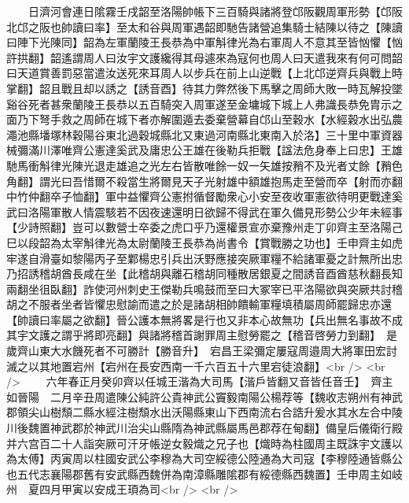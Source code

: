 　　日濟河會連日隂霧壬戌韶至洛陽帥帳下三百騎與諸將登邙阪觀周軍形勢【邙阪北邙之阪也帥讀曰率】至太和谷與周軍遇韶即馳告諸營追集騎士結陳以待之【陳讀曰陣下光陳同】韶為左軍蘭陵王長恭為中軍斛律光為右軍周人不意其至皆忷懼【忷許拱翻】韶遙謂周人曰汝宇文護纔得其母遽來為寇何也周人曰天遣我來有何可問韶曰天道賞善罰惡當遣汝送死來耳周人以步兵在前上山逆戰【上北邙逆齊兵與戰上時掌翻】韶且戰且却以誘之【誘音酉】待其力弊然後下馬擊之周師大敗一時瓦解投墜谿谷死者甚衆蘭陵王長恭以五百騎突入周軍遂至金墉城下城上人弗識長恭免胄示之面乃下弩手救之周師在城下者亦解圍遁去委棄營幕自邙山至穀水【水經穀水出弘農澠池縣墦塚林穀陽谷東北過穀城縣北又東過河南縣北東南入於洛】三十里中軍資器械彌滿川澤唯齊公憲達奚武及庸忠公王雄在後勒兵拒戰【諡法危身奉上曰忠】王雄馳馬衝斛律光陳光退走雄追之光左右皆散唯餘一奴一矢雄按矟不及光者丈餘【矟色角翻】謂光曰吾惜爾不殺當生將爾見天子光射雄中額雄抱馬走至營而卒【射而亦翻中竹仲翻卒子恤翻】軍中益懼齊公憲拊循督勵衆心小安至夜收軍憲欲待明更戰達奚武曰洛陽軍散人情震駭若不因夜速還明日欲歸不得武在軍久備見形勢公少年未經事【少詩照翻】豈可以數營士卒委之虎口乎乃還權景宣亦棄豫州走丁卯齊主至洛陽己巳以段韶為太宰斛律光為太尉蘭陵王長恭為尚書令【賞戰勝之功也】壬申齊主如虎牢遂自滑臺如黎陽丙子至鄴楊忠引兵出沃野應接突厥軍糧不給諸軍憂之計無所出忠乃招誘稽胡酋長咸在坐【此稽胡與離石稽胡同種散居銀夏之間誘音酉酋慈秋翻長知兩翻坐徂臥翻】詐使河州刺史王傑勒兵鳴鼓而至曰大冢宰已平洛陽欲與突厥共討稽胡之不服者坐者皆懼忠慰諭而遣之於是諸胡相帥饋輸軍糧填積屬周師罷歸忠亦還【帥讀曰率屬之欲翻】晉公護本無將畧是行也又非本心故無功【兵出無名事故不成其宇文護之謂乎將即亮翻】與諸將稽首謝罪周主慰勞罷之【稽音啓勞力到翻】　是歲齊山東大水饑死者不可勝計【勝音升】　宕昌王梁彌定屢寇周邉周大將軍田宏討滅之以其地置宕州【宕州在長安西南一千六百五十六里宕徒浪翻】<br />
<br />
　　六年春正月癸卯齊以任城王湝為大司馬【湝戶皆翻又音皆任音壬】　齊主如晉陽　二月辛丑周遣陳公純許公貴神武公竇毅南陽公楊荐等【魏收志朔州有神武郡領尖山樹頹二縣水經注樹頹水出沃陽縣東山下西南流右合誥升爰水其水左合中陵川後魏置神武郡於神武川治尖山縣隋為神武縣屬馬邑郡荐在甸翻】備皇后儀衛行殿并六宫百二十人詣突厥可汗牙帳逆女毅熾之兄子也【熾時為柱國周主既誅宇文護以為太傅】丙寅周以柱國安武公李穆為大司空綏德公陸通為大司寇【李穆陸通皆縣公也五代志襄陽郡舊有安武縣西魏併為南漳縣雕隂郡有綏德縣西魏置】壬申周主如岐州　夏四月甲寅以安成王頊為司<br />
<br />
